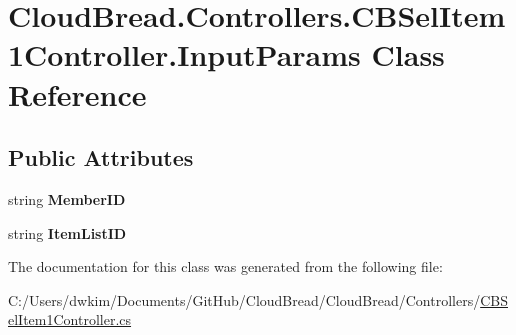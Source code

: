\hypertarget{class_cloud_bread_1_1_controllers_1_1_c_b_sel_item1_controller_1_1_input_params}{}\section{Cloud\+Bread.\+Controllers.\+C\+B\+Sel\+Item1\+Controller.\+Input\+Params Class Reference}
\label{class_cloud_bread_1_1_controllers_1_1_c_b_sel_item1_controller_1_1_input_params}
\subsection*{Public Attributes}
\begin{DoxyCompactItemize}
\item 
string {\bfseries Member\+ID}\hypertarget{class_cloud_bread_1_1_controllers_1_1_c_b_sel_item1_controller_1_1_input_params_a0112127750f7c6567221c75df29714e3}{}\label{class_cloud_bread_1_1_controllers_1_1_c_b_sel_item1_controller_1_1_input_params_a0112127750f7c6567221c75df29714e3}

\item 
string {\bfseries Item\+List\+ID}\hypertarget{class_cloud_bread_1_1_controllers_1_1_c_b_sel_item1_controller_1_1_input_params_ad966be609993d309a0ae9373c4844f26}{}\label{class_cloud_bread_1_1_controllers_1_1_c_b_sel_item1_controller_1_1_input_params_ad966be609993d309a0ae9373c4844f26}

\end{DoxyCompactItemize}


The documentation for this class was generated from the following file\+:\begin{DoxyCompactItemize}
\item 
C\+:/\+Users/dwkim/\+Documents/\+Git\+Hub/\+Cloud\+Bread/\+Cloud\+Bread/\+Controllers/\hyperlink{_c_b_sel_item1_controller_8cs}{C\+B\+Sel\+Item1\+Controller.\+cs}\end{DoxyCompactItemize}
